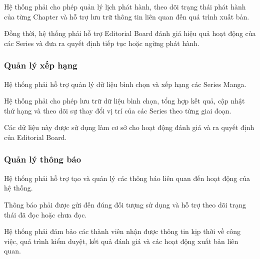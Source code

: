 \documentclass[12pt,a4paper]{article}
\begin{document}
Hệ thống phải cho phép quản lý lịch phát hành, theo dõi trạng thái phát hành của từng Chapter và hỗ trợ lưu trữ thông tin liên quan đến quá trình xuất bản.

Đồng thời, hệ thống phải hỗ trợ Editorial Board đánh giá hiệu quả hoạt động của các Series và đưa ra quyết định tiếp tục hoặc ngừng phát hành.

\subsubsection{Quản lý xếp hạng}
Hệ thống phải hỗ trợ quản lý dữ liệu bình chọn và xếp hạng các Series Manga.

Hệ thống phải cho phép lưu trữ dữ liệu bình chọn, tổng hợp kết quả, cập nhật thứ hạng và theo dõi sự thay đổi vị trí của các Series theo từng giai đoạn.

Các dữ liệu này được sử dụng làm cơ sở cho hoạt động đánh giá và ra quyết định của Editorial Board.

\subsubsection{Quản lý thông báo}
Hệ thống phải hỗ trợ tạo và quản lý các thông báo liên quan đến hoạt động của hệ thống.

Thông báo phải được gửi đến đúng đối tượng sử dụng và hỗ trợ theo dõi trạng thái đã đọc hoặc chưa đọc.

Hệ thống phải đảm bảo các thành viên nhận được thông tin kịp thời về công việc, quá trình kiểm duyệt, kết quả đánh giá và các hoạt động xuất bản liên quan.
\end{document}
